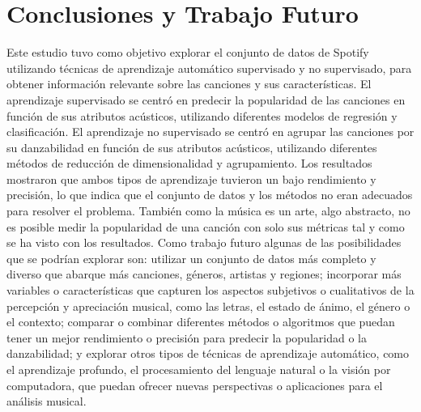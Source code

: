 \documentclass{wsdcr}
\begin{document}
\section{Conclusiones y Trabajo Futuro}
Este estudio tuvo como objetivo explorar el conjunto de datos de Spotify utilizando técnicas de aprendizaje automático supervisado y no supervisado, para obtener información relevante sobre las canciones y sus características. El aprendizaje supervisado se centró en predecir la popularidad de las canciones en función de sus atributos acústicos, utilizando diferentes modelos de regresión y clasificación. El aprendizaje no supervisado se centró en agrupar las canciones por su danzabilidad en función de sus atributos acústicos, utilizando diferentes métodos de reducción de dimensionalidad y agrupamiento. Los resultados mostraron que ambos tipos de aprendizaje tuvieron un bajo rendimiento y precisión, lo que indica que el conjunto de datos y los métodos no eran adecuados para resolver el problema. También como la música es un arte, algo abstracto, no es posible medir la popularidad de una canción con solo sus métricas tal y como se ha visto con los resultados.
Como trabajo futuro algunas de las posibilidades que se podrían explorar son: utilizar un conjunto de datos más completo y diverso que abarque más canciones, géneros, artistas y regiones; incorporar más variables o características que capturen los aspectos subjetivos o cualitativos de la percepción y apreciación musical, como las letras, el estado de ánimo, el género o el contexto; comparar o combinar diferentes métodos o algoritmos que puedan tener un mejor rendimiento o precisión para predecir la popularidad o la danzabilidad; y explorar otros tipos de técnicas de aprendizaje automático, como el aprendizaje profundo, el procesamiento del lenguaje natural o la visión por computadora, que puedan ofrecer nuevas perspectivas o aplicaciones para el análisis musical.



\end{document}
